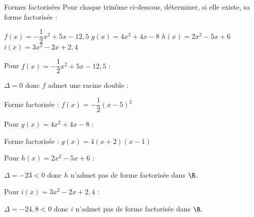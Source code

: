 \def\rdifficulty{2}
\begin{EXO}{Formes factorisées}{}
Pour chaque trinôme ci-dessous, déterminer, si elle existe, sa forme factorisée :
\begin{tcbenumerate}[4]
\tcbitem {} $f(x)=-\dfrac{1}{2}x^2+5x-12,5$
\tcbitem {} $g(x)=4x^2+4x-8$
\tcbitem {} $h(x)=2x^2-5x+6$
\tcbitem {} $i(x)=3x^2-2x+2,4$\\
\end{tcbenumerate}

\exocorrection

\begin{tcbenumerate}[1]
\tcbitem Pour $f(x)=-\dfrac{1}{2}x^2+5x-12,5$ :


$\Delta = 0$ donc $f$ admet une racine double : 

Forme factorisée : $f(x) = -\dfrac{1}{2}(x-5)^2$

\tcbitem Pour $g(x)=4x^2+4x-8$ :


Forme factorisée : $g(x) = 4(x+2)(x-1)$

\tcbitem Pour $h(x)=2x^2-5x+6$ :


$\Delta = -23 < 0$ donc $h$ n'admet pas de forme factorisée dans $\R$.

\tcbitem Pour $i(x)=3x^2-2x+2,4$ :


$\Delta = -24,8 < 0$ donc $i$ n'admet pas de forme factorisée dans $\R$.
\end{tcbenumerate}
\end{EXO}

